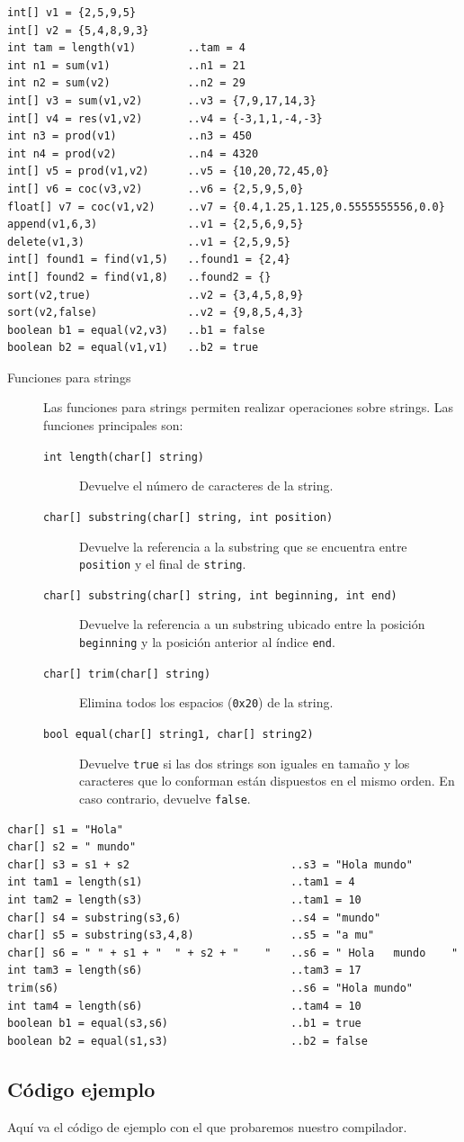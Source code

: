 \documentclass[11pt, english]{article}
\begin{document}
\begin{lstlisting}[caption=Ejemplo de uso de funciones primitivas para arrays numéricos]
int[] v1 = {2,5,9,5}
int[] v2 = {5,4,8,9,3}
int tam = length(v1)		..tam = 4
int n1 = sum(v1)			..n1 = 21
int n2 = sum(v2)			..n2 = 29
int[] v3 = sum(v1,v2)		..v3 = {7,9,17,14,3}
int[] v4 = res(v1,v2)		..v4 = {-3,1,1,-4,-3}
int n3 = prod(v1)			..n3 = 450
int n4 = prod(v2)			..n4 = 4320
int[] v5 = prod(v1,v2)		..v5 = {10,20,72,45,0}
int[] v6 = coc(v3,v2)		..v6 = {2,5,9,5,0}
float[] v7 = coc(v1,v2)		..v7 = {0.4,1.25,1.125,0.5555555556,0.0}
append(v1,6,3)				..v1 = {2,5,6,9,5}
delete(v1,3)				..v1 = {2,5,9,5}
int[] found1 = find(v1,5)	..found1 = {2,4}
int[] found2 = find(v1,8)	..found2 = {}
sort(v2,true)				..v2 = {3,4,5,8,9}
sort(v2,false)				..v2 = {9,8,5,4,3}
boolean b1 = equal(v2,v3)	..b1 = false
boolean b2 = equal(v1,v1)	..b2 = true
\end{lstlisting}

\begin{description}
	\item[Funciones para strings] Las funciones para strings permiten realizar operaciones sobre strings. Las funciones principales son:
	\begin{description}
		\item[\texttt{int length(char[] string)}] Devuelve el número de caracteres de la string.
		\item[\texttt{char[] substring(char[] string, int position)}] Devuelve la referencia a la substring que se encuentra entre \texttt{position} y el final de \texttt{string}.
		\item[\texttt{char[] substring(char[] string, int beginning, int end)}] Devuelve la referencia a un substring ubicado entre la posición \texttt{beginning} y la posición anterior al índice \texttt{end}.
		\item[\texttt{char[] trim(char[] string)}] Elimina todos los espacios (\texttt{0x20}) de la string.
		\item[\texttt{bool equal(char[] string1, char[] string2)}] Devuelve \texttt{true} si las dos strings son iguales en tamaño y los caracteres que lo conforman están dispuestos en el mismo orden. En caso contrario, devuelve \texttt{false}.
	\end{description}
\end{description}

\begin{lstlisting}[caption=Ejemplo de uso de funciones primitivas para strings]
char[] s1 = "Hola"
char[] s2 = " mundo"
char[] s3 = s1 + s2							..s3 = "Hola mundo"
int tam1 = length(s1)						..tam1 = 4
int tam2 = length(s3)						..tam1 = 10
char[] s4 = substring(s3,6)					..s4 = "mundo"
char[] s5 = substring(s3,4,8)				..s5 = "a mu"
char[] s6 = " " + s1 + "  " + s2 + "    "	..s6 = " Hola   mundo    "
int tam3 = length(s6)						..tam3 = 17
trim(s6)									..s6 = "Hola mundo"
int tam4 = length(s6)						..tam4 = 10
boolean b1 = equal(s3,s6)					..b1 = true
boolean b2 = equal(s1,s3)					..b2 = false
\end{lstlisting}

\subsection{Código ejemplo}\label{example-code}
Aquí va el código de ejemplo con el que probaremos nuestro compilador.
\end{document}

